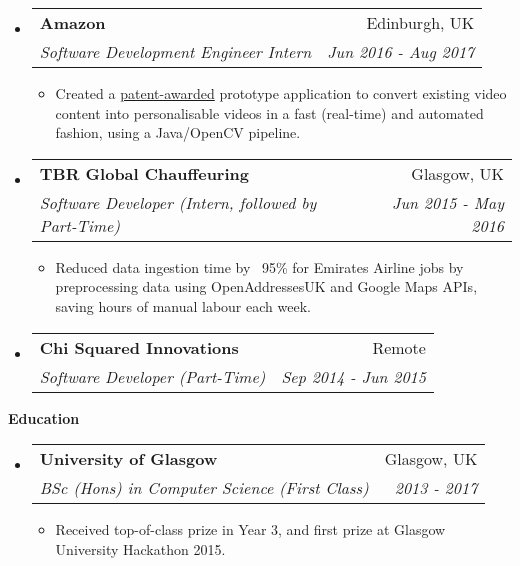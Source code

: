 \documentclass[letterpaper,11pt]{article}
\makeatletter
\newcommand{\resitem}[1]{\item #1 \vspace{-2pt}}
\newcommand{\resheading}[1]{{\large \colorbox{mygrey}{\begin{minipage}{\textwidth}{\textbf{#1 \vphantom{p\^{E}}}}\end{minipage}}}}
\newcommand{\ressubheading}[4]{
\begin{tabular*}{7.0in}{l@{\extracolsep{\fill}}r}
	\textbf{#1} & #2 \\
	\textit{#3} & \textit{#4} \\
\end{tabular*}\vspace{-6pt}}
\makeatother
\begin{document}
\begin{itemize}
		\item
		\ressubheading{Amazon}{Edinburgh, UK}{Software Development Engineer Intern}{Jun 2016 - Aug 2017}
		\begin{itemize}
			\resitem{Created a \href{https://pdfpiw.uspto.gov/.piw?PageNum=0&docid=10297026&IDKey=E3B5AD2132FF&HomeUrl=\%2F\%2Fpatft.uspto.gov\%2Fnetahtml\%2FPTO\%2Fpatimg.htm}{patent-awarded} prototype application to convert existing video content into personalisable videos in a fast (real-time)
			and automated fashion, using a Java/OpenCV pipeline.}
		\end{itemize}

		\item
		\ressubheading{TBR Global Chauffeuring}{Glasgow, UK}{Software Developer (Intern, followed by Part-Time)}{Jun 2015 - May 2016}
		\begin{itemize}
			\resitem{Reduced data ingestion time by ~95\% for Emirates Airline jobs by preprocessing data using OpenAddressesUK and Google Maps APIs, saving hours of manual labour each week.}
		\end{itemize}

		\item
		\ressubheading{Chi Squared Innovations}{Remote}{Software Developer (Part-Time)}{Sep 2014 - Jun 2015}

	\end{itemize}

	\resheading{Education}
	\begin{itemize}
		\item
		\ressubheading{University of Glasgow}{Glasgow, UK}{BSc (Hons) in Computer Science (First Class)}{2013 - 2017}
		\begin{itemize}
			\resitem{Received top-of-class prize in Year 3, and first prize at Glasgow University Hackathon 2015.}
		\end{itemize}
	\end{itemize}
\end{document}
